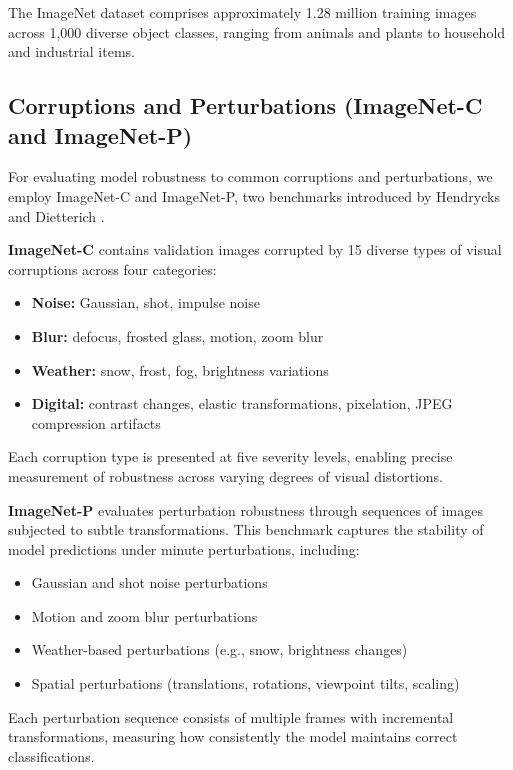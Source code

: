 \documentclass[11pt, oneside]{article}   	%
\begin{document}
The ImageNet dataset comprises approximately 1.28 million training images across 1,000 diverse object classes, ranging from animals and plants to household and industrial items. 

\subsection*{Corruptions and Perturbations (ImageNet-C and ImageNet-P)}

For evaluating model robustness to common corruptions and perturbations, we employ ImageNet-C and ImageNet-P, two benchmarks introduced by Hendrycks and Dietterich \cite{hendrycks2019benchmarkingneuralnetworkrobustness}.

\textbf{ImageNet-C} contains validation images corrupted by 15 diverse types of visual corruptions across four categories:

\begin{itemize}
\item \textbf{Noise:} Gaussian, shot, impulse noise
\item \textbf{Blur:} defocus, frosted glass, motion, zoom blur
\item \textbf{Weather:} snow, frost, fog, brightness variations
\item \textbf{Digital:} contrast changes, elastic transformations, pixelation, JPEG compression artifacts
\end{itemize}

Each corruption type is presented at five severity levels, enabling precise measurement of robustness across varying degrees of visual distortions.

\textbf{ImageNet-P} evaluates perturbation robustness through sequences of images subjected to subtle transformations. This benchmark captures the stability of model predictions under minute perturbations, including:

\begin{itemize}
\item Gaussian and shot noise perturbations
\item Motion and zoom blur perturbations
\item Weather-based perturbations (e.g., snow, brightness changes)
\item Spatial perturbations (translations, rotations, viewpoint tilts, scaling)
\end{itemize}

Each perturbation sequence consists of multiple frames with incremental transformations, measuring how consistently the model maintains correct classifications.
\end{document}
